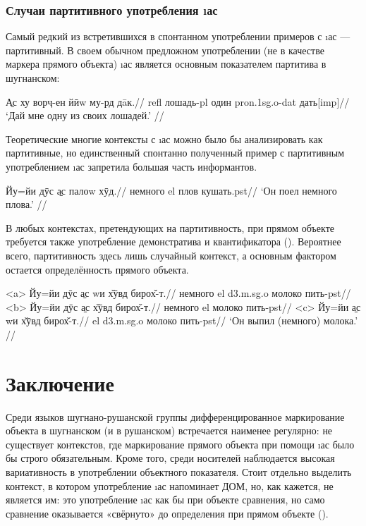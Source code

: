 \subsubsection{Случаи партитивного употребления \i{ас}} \label{dom-as}

Самый редкий из встретившихся в спонтанном употреблении примеров с \i{ас} — партитивный. В своем обычном предложном употреблении (не в качестве маркера прямого объекта) \i{ас} является основным показателем партитива в шугнанском:

\begingl
\gla \b{Ас} ху ворҷ-ен йӣw му-рд дāк.//
 {\sc refl} лошадь-{\sc pl} один {\sc pron.1sg.o-dat} дать[{\sc imp}]//
\glft ‘Дай мне одну из своих лошадей.’ //
\endgl \xe

Теоретические многие контексты с \i{ас} можно было бы анализировать как партитивные, но единственный спонтанно полученный пример с партитивным употреблением \i{ас} запретила большая часть информантов.

\begingl
\gla {}Йу=йи дӯс \b{ас} палоw хӯд.//
 немного {\sc el} плов кушать.{\sc pst}//
\glft ‘Он поел немного плова.’ \trailingcitation{[элицитация, 2022]}//
\endgl \xe

В любых контекстах, претендующих на партитивность, при прямом объекте требуется также употребление демонстратива и квантификатора (). Вероятнее всего, партитивность здесь лишь случайный контекст, а основным фактором остается определённость прямого объекта.

\a<a> \begingl
\gla Йу=йи дӯс \b{ас} wи х̌ӯвд бирох̌-т.//
 немного {\sc el} {\sc d3.m.sg.o} молоко пить-{\sc pst}//
\endgl
\a<b> \begingl
\gla \ljudge{*}Йу=йи дӯс \b{ас} х̌ӯвд бирох̌-т.//
 немного {\sc el} молоко пить-{\sc pst}//
\endgl
\a<c> \begingl
\gla \ljudge{*}Йу=йи \b{ас} wи х̌ӯвд бирох̌-т.//
 {\sc el} {\sc d3.m.sg.o} молоко пить-{\sc pst}//
\glft ‘Он выпил (немного) молока.’ \trailingcitation{[элицитация, 2022]}//
\endgl \xe

\section{Заключение}

Среди языков шугнано-рушанской группы дифференцированное маркирование объекта в шугнанском (и в рушанском) встречается наименее регулярно: не существует контекстов, где маркирование прямого объекта при помощи \i{ас} было бы строго обязательным. Кроме того, среди носителей наблюдается высокая вариативность в употреблении объектного показателя. Стоит отдельно выделить контекст, в котором употребление \i{ас} напоминает ДОМ, но, как кажется, не является им: это употребление \i{ас} как бы при объекте сравнения, но само сравнение оказывается «свёрнуто» до определения при прямом объекте ().


